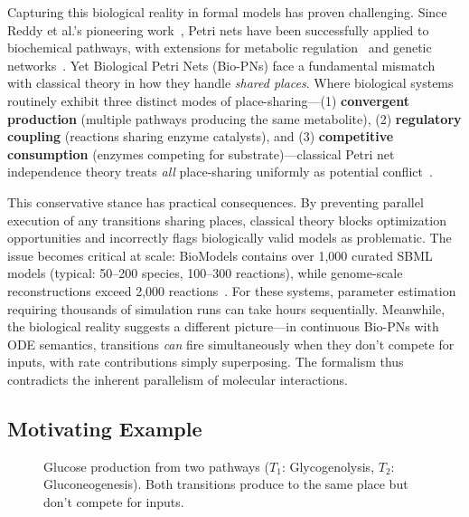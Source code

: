 \documentclass[twocolumn,11pt]{article}
\begin{document}
Capturing this biological reality in formal models has proven challenging. Since Reddy et al.'s pioneering work~\cite{Reddy1993}, Petri nets have been successfully applied to biochemical pathways, with extensions for metabolic regulation~\cite{Simao2005} and genetic networks~\cite{Chaouiya2006}. Yet Biological Petri Nets (Bio-PNs) face a fundamental mismatch with classical theory in how they handle \emph{shared places}. Where biological systems routinely exhibit three distinct modes of place-sharing---(1) \textbf{convergent production} (multiple pathways producing the same metabolite), (2) \textbf{regulatory coupling} (reactions sharing enzyme catalysts), and (3) \textbf{competitive consumption} (enzymes competing for substrate)---classical Petri net independence theory treats \emph{all} place-sharing uniformly as potential conflict~\cite{Reisig2013}.

This conservative stance has practical consequences. By preventing parallel execution of any transitions sharing places, classical theory blocks optimization opportunities and incorrectly flags biologically valid models as problematic. The issue becomes critical at scale: BioModels contains over 1,000 curated SBML models (typical: 50--200 species, 100--300 reactions), while genome-scale reconstructions exceed 2,000 reactions~\cite{Orth2011}. For these systems, parameter estimation requiring thousands of simulation runs can take hours sequentially. Meanwhile, the biological reality suggests a different picture---in continuous Bio-PNs with ODE semantics, transitions \emph{can} fire simultaneously when they don't compete for inputs, with rate contributions simply superposing. The formalism thus contradicts the inherent parallelism of molecular interactions.

\subsection{Motivating Example}

\begin{figure}[htbp]
\centering
{}
\caption{Glucose production from two pathways ($T_1$: Glycogenolysis, $T_2$: Gluconeogenesis). Both transitions produce to the same place but don't compete for inputs.}
\label{fig:glucose_example}
\end{figure}
\end{document}
